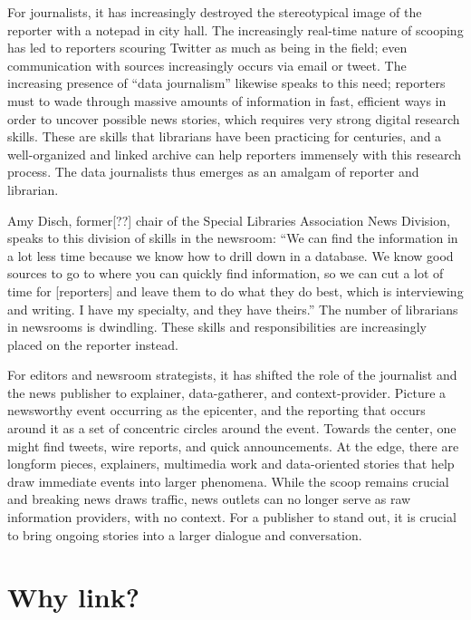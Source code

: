 For journalists, it has increasingly destroyed the stereotypical image of the reporter with a notepad in city hall. The increasingly real-time nature of scooping has led to reporters scouring Twitter as much as being in the field; even communication with sources increasingly occurs via email or tweet. The increasing presence of ``data journalism'' likewise speaks to this need; reporters must to wade through massive amounts of information in fast, efficient ways in order to uncover possible news stories, which requires very strong digital research skills. These are skills that librarians have been practicing for centuries, and a well-organized and linked archive can help reporters immensely with this research process. The data journalists thus emerges as an amalgam of reporter and librarian.

Amy Disch, former[??] chair of the Special Libraries Association News Division, speaks to this division of skills in the newsroom: ``We can find the information in a lot less time because we know how to drill down in a database. We know good sources to go to where you can quickly find information, so we can cut a lot of time for [reporters] and leave them to do what they do best, which is interviewing and writing. I have my specialty, and they have theirs.''\autocite{} The number of librarians in newsrooms is dwindling. %
These skills and responsibilities are increasingly placed on the reporter instead.

For editors and newsroom strategists, it has shifted the role of the journalist and the news publisher to explainer, data-gatherer, and context-provider. Picture a newsworthy event occurring as the epicenter, and the reporting that occurs around it as a set of concentric circles around the event. Towards the center, one might find tweets, wire reports, and quick announcements. At the edge, there are longform pieces, explainers, multimedia work and data-oriented stories that help draw immediate events into larger phenomena. While the scoop remains crucial and breaking news draws traffic, news outlets can no longer serve as raw information providers, with no context. For a publisher to stand out, it is crucial to bring ongoing stories into a larger dialogue and conversation.

\section{Why link?}

